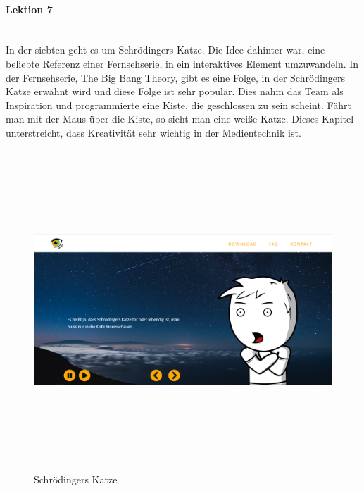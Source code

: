 \paragraph{Lektion 7} \leavevmode \\
In der siebten geht es um Schrödingers Katze. Die Idee dahinter war, eine beliebte Referenz einer Fernsehserie, in ein interaktives Element umzuwandeln. In der Fernsehserie, The Big Bang Theory, gibt es eine Folge, in der Schrödingers Katze erwähnt wird und diese Folge ist sehr populär. Dies nahm das Team als Inspiration und programmierte eine Kiste, die geschlossen zu sein scheint. Fährt man mit der Maus über die Kiste, so sieht man eine weiße Katze. Dieses Kapitel unterstreicht, dass Kreativität sehr wichtig in der Medientechnik ist.
\begin{figure} [h]
	\centering
\includegraphics[width=12cm,height=12cm,keepaspectratio]{webseite_abb18} 
	\caption{Schrödingers Katze}
\end{figure}
